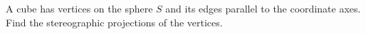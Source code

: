 A cube has vertices on the sphere $S$ and its edges parallel to the coordinate axes. Find the
stereographic projections of the vertices.\\